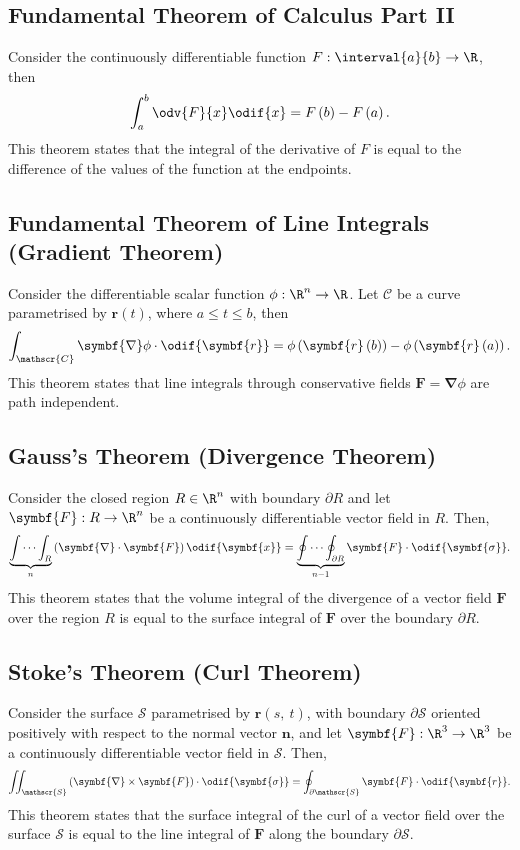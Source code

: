 \documentclass{article}
\begin{document}
\subsection{Fundamental Theorem of Calculus Part II}
Consider the continuously differentiable function \(F:\interval{a}{b}
\to \R\), then
\begin{equation*}
    \int_a^b \odv{F}{x} \odif{x} = F\left( b \right) - F\left( a \right).
\end{equation*}
This theorem states that the integral of the derivative of \(F\) is
equal to the difference of the values of the function at the endpoints.
\subsection{Fundamental Theorem of Line Integrals (Gradient Theorem)}
Consider the differentiable scalar function \(\phi:\R^n \to \R\). Let
\(\mathscr{C}\) be a curve parametrised by \(\symbf{r}\left( t
\right)\), where \(a \leq t \leq b\), then
\begin{equation*}
    \int_{\mathscr{C}} \symbf{\nabla} \phi \cdot \odif{\symbf{r}} = \phi\left( \symbf{r}\left( b \right) \right) - \phi\left( \symbf{r}\left( a \right) \right).
\end{equation*}
This theorem states that line integrals through conservative fields
\(\symbf{F} = \symbf{\nabla} \phi\) are path independent.
\subsection{Gauss's Theorem (Divergence Theorem)}
Consider the closed region \(R \in \R^n\) with boundary \(\partial R\)
and let \(\symbf{F}:R \to \R^n\) be a continuously differentiable
vector field in \(R\). Then,
\begin{equation*}
    \underbrace{\int \cdots \int_R}_n \left( \symbf{\nabla} \cdot \symbf{F} \right) \odif{\symbf{x}} = \underbrace{\oint \cdots \oint_{\partial R}}_{n-1} \symbf{F} \cdot \odif{\symbf{\sigma}}.
\end{equation*}
This theorem states that the volume integral of the divergence of a
vector field \(\symbf{F}\) over the region \(R\) is equal to the surface
integral of \(\symbf{F}\) over the boundary \(\partial R\).
\subsection{Stoke's Theorem (Curl Theorem)}
Consider the surface \(\mathscr{S}\) parametrised by \(\symbf{r}\left(
s,\: t \right)\), with boundary \(\partial \mathscr{S}\) oriented
positively with respect to the normal vector \(\symbf{n}\), and let
\(\symbf{F}:\R^3 \to \R^3\) be a continuously differentiable vector
field in \(\mathscr{S}\). Then,
\begin{equation*}
    \iint_{\mathscr{S}} \left( \symbf{\nabla} \times \symbf{F} \right) \cdot \odif{\symbf{\sigma}} = \oint_{\partial \mathscr{S}} \symbf{F} \cdot \odif{\symbf{r}}.
\end{equation*}
This theorem states that the surface integral of the curl of a vector
field over the surface \(\mathscr{S}\) is equal to the line integral of
\(\symbf{F}\) along the boundary \(\partial \mathscr{S}\).
\end{document}
